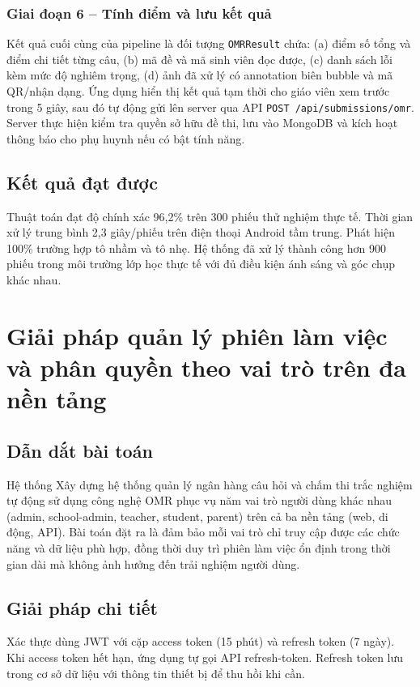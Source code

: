 ﻿\documentclass[../DoAn.tex]{subfiles}
\begin{document}
\subsubsection{Giai đoạn 6 -- Tính điểm và lưu kết quả}
Kết quả cuối cùng của pipeline là đối tượng \texttt{OMRResult} chứa: (a) điểm số tổng và điểm chi tiết từng câu, (b) mã đề và mã sinh viên đọc được, (c) danh sách lỗi kèm mức độ nghiêm trọng, (d) ảnh đã xử lý có annotation biên bubble và mã QR/nhận dạng. Ứng dụng hiển thị kết quả tạm thời cho giáo viên xem trước trong 5 giây, sau đó tự động gửi lên server qua API \texttt{POST /api/submissions/omr}. Server thực hiện kiểm tra quyền sở hữu đề thi, lưu vào MongoDB và kích hoạt thông báo cho phụ huynh nếu có bật tính năng.

\subsection{Kết quả đạt được}
Thuật toán đạt độ chính xác 96,2\% trên 300 phiếu thử nghiệm thực tế. Thời gian xử lý trung bình 2,3 giây/phiếu trên điện thoại Android tầm trung. Phát hiện 100\% trường hợp tô nhầm và tô nhẹ. Hệ thống đã xử lý thành công hơn 900 phiếu trong môi trường lớp học thực tế với đủ điều kiện ánh sáng và góc chụp khác nhau.
\section{Giải pháp quản lý phiên làm việc và phân quyền theo vai trò trên đa nền tảng}
\label{section:5.4}

\subsection{Dẫn dắt bài toán}
Hệ thống Xây dựng hệ thống quản lý ngân hàng câu hỏi và chấm thi trắc nghiệm tự động sử dụng công nghệ OMR phục vụ năm vai trò người dùng khác nhau (admin, school-admin, teacher, student, parent) trên cả ba nền tảng (web, di động, API). Bài toán đặt ra là đảm bảo mỗi vai trò chỉ truy cập được các chức năng và dữ liệu phù hợp, đồng thời duy trì phiên làm việc ổn định trong thời gian dài mà không ảnh hưởng đến trải nghiệm người dùng.

\subsection{Giải pháp chi tiết}
Xác thực dùng JWT với cặp access token (15 phút) và refresh token (7 ngày). Khi access token hết hạn, ứng dụng tự gọi API refresh-token. Refresh token lưu trong cơ sở dữ liệu với thông tin thiết bị để thu hồi khi cần.
\end{document}
